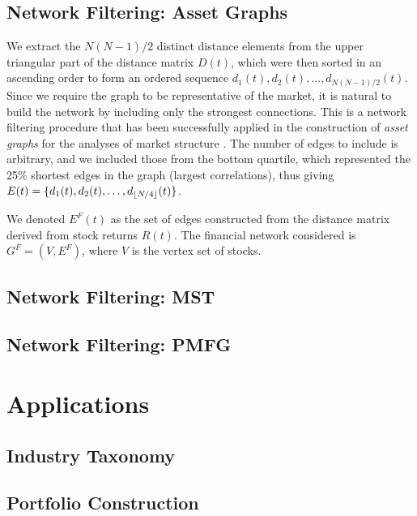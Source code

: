 \documentclass[]{book}
\theoremstyle{definition}
\theoremstyle{definition}
\theoremstyle{definition}
\theoremstyle{remark}
\begin{document}
\subsection{Network Filtering: Asset
Graphs}\label{network-filtering-asset-graphs}

We extract the \(N(N-1)/2\) distinct distance elements from the upper
triangular part of the distance matrix \(D(t)\), which were then sorted
in an ascending order to form an ordered sequence
\(d_1(t), d_2(t), \ldots, d_{N(N-1)/2}(t)\). Since we require the graph
to be representative of the market, it is natural to build the network
by including only the strongest connections. This is a network filtering
procedure that has been successfully applied in the construction of
\textit{asset graphs} for the analyses of market structure
\cite{1402-4896-2003-T106-011, refId0-Onnela-2004}. The number of edges
to include is arbitrary, and we included those from the bottom quartile,
which represented the 25\% shortest edges in the graph (largest
correlations), thus giving
\(E(t) = \{d_1(t), d_2(t), \ldots, d_{\lfloor N/4\rfloor}(t)\}\).

We denoted \(E^{F}(t)\) as the set of edges constructed from the
distance matrix derived from stock returns \(R(t)\). The financial
network considered is \(G^{F} = ( V, E^{F} )\), where \(V\) is the
vertex set of stocks.

\subsection{Network Filtering: MST}\label{network-filtering-mst}

\subsection{Network Filtering: PMFG}\label{network-filtering-pmfg}

\section{Applications}\label{applications}

\subsection{Industry Taxonomy}\label{industry-taxonomy}

\subsection{Portfolio Construction}\label{portfolio-construction}
\end{document}

